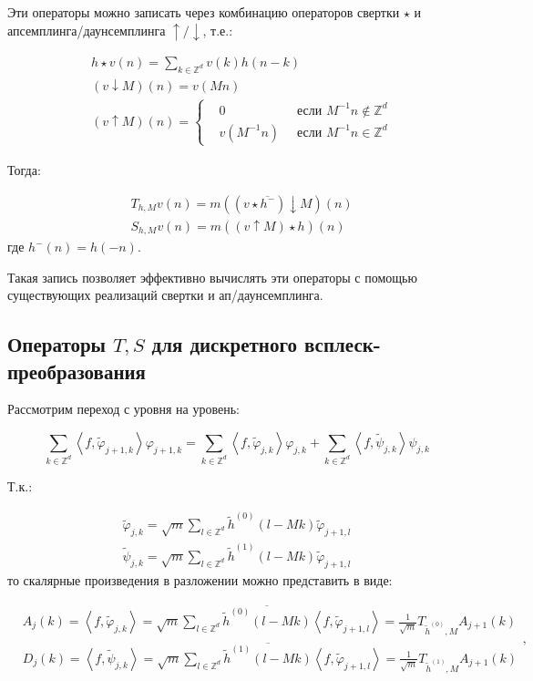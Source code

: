 \documentclass[a4paper,article,14pt]{extarticle}
\begin{document}
Эти операторы можно записать через комбинацию операторов свертки $\star$ и апсемплинга/даунсемплинга $\uparrow/\downarrow$, т.е.:

\[
	\begin{split}
		&h \star v(n) = \sum_{k \in \mathbb{Z}^d} v(k) h(n-k) \\
		&(v \downarrow M)(n) = v(Mn) \\
		&(v \uparrow M)(n) = \left\{ \begin{aligned} &0 ~& \text{ если }M^{-1} n \notin \mathbb{Z}^d \\ &v(M^{-1} n) ~& \text{ если } M^{-1} n \in \mathbb{Z}^d\end{aligned}\right.
	\end{split} \tag{4}
\]

Тогда:

\[
	\begin{split}
		&T_{h,M} v(n) = m \left( \left( v \star \overline{h^-}\right)\downarrow M\right) (n) \\
		&S_{h,M} v(n) = m \left( \left(v \uparrow M \right) \star h \right) (n)
	\end{split}
\]
где $h^-(n)=h(-n)$.

Такая запись позволяет эффективно вычислять эти операторы с помощью существующих реализаций свертки и ап/даунсемплинга.

\subsection{Операторы $T,S$ для дискретного всплеск-преобразования}

Рассмотрим переход с уровня на уровень:

\[
	\sum_{k \in \mathbb{Z}^d} \left< f, \widetilde{\varphi}_{j+1,k}\right> \varphi_{j+1,k} = \sum_{k \in \mathbb{Z}^d} \left< f, \widetilde{\varphi}_{j,k}\right> \varphi_{j,k} + \sum_{k \in \mathbb{Z}^d} \left< f, \widetilde{\psi}_{j,k}\right>\psi_{j,k}
\]

Т.к.:

\[
	\begin{split}
		\widetilde{\varphi}_{j,k} = \sqrt{m}\sum_{l \in \mathbb{Z}^d} \widetilde{h}^{(0)} (l-Mk) \widetilde{\varphi}_{j+1,l} \\
		\widetilde{\psi}_{j,k} = \sqrt{m}\sum_{l \in \mathbb{Z}^d} \widetilde{h}^{(1)} (l-Mk) \widetilde{\varphi}_{j+1,l}
	\end{split}
\]
то скалярные произведения в разложении можно представить в виде:

\[
	\begin{split}
		&A_j (k) = \left< f, \widetilde{\varphi}_{j,k}\right> = \sqrt{m}\sum_{l \in \mathbb{Z}^d} \overline{\widetilde{h}^{(0)}(l-Mk)}\left<f, \widetilde{\varphi}_{j+1,l} \right> = \frac{1}{\sqrt{m}} T_{\widetilde{h}^{(0)},M} A_{j+1} (k) \\
		&D_j (k) = \left< f, \widetilde{\psi}_{j,k}\right> = \sqrt{m} \sum_{l \in \mathbb{Z}^d} \overline{\widetilde{h}^{(1)}(l-Mk)} \left< f, \widetilde{\varphi}_{j+1,l}\right> = \frac{1}{\sqrt{m}} T_{\widetilde{h}^{(1)},M} A_{j+1} (k)
	\end{split},
\]
\end{document}
